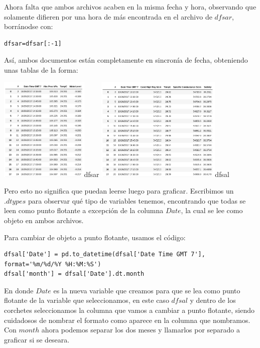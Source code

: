 \documentclass{article}
\begin{document}
Ahora falta que ambos archivos acaben en la misma fecha y hora, observando que solamente difieren por una hora de más encontrada en el archivo de $dfsar$, borránodse con:

\begin{verbatim}
dfsar=dfsar[:-1]
\end{verbatim}

Así, ambos documentos están completamente en sincronía de fecha, obteniendo unas tablas de la forma:

	\begin{center}
    \includegraphics[height=5cm]{headsar.png}{dfsar}
    \includegraphics[height=5cm]{headsal.png}{dfsal}
    \end{center}

Pero esto no significa que puedan leerse luego para graficar. Escribimos un $.dtypes$ para observar qué tipo de variables tenemos, encontrando que todas se leen como punto flotante a excepción de la columna $Date$, la cual se lee como objeto en ambos archivos. 

Para cambiar de objeto a punto flotante, usamos el código:

\begin{verbatim}
dfsal['Date'] = pd.to_datetime(dfsal['Date Time GMT 7'], format='%m/%d/%Y %H:%M:%S')
dfsal['month'] = dfsal['Date'].dt.month
\end{verbatim}

En donde $Date$ es la nueva variable que creamos para que se lea como punto flotante de la variable que seleccionamos, en este caso $dfsal$ y dentro de los corchetes seleccionamos la columna que vamos a cambiar a punto flotante, siendo cuidadosos de nombrar el formato como aparece en la columna que nombramos. Con $month$ ahora podemos separar los dos meses y llamarlos por separado a graficar si se deseara.
\end{document}
